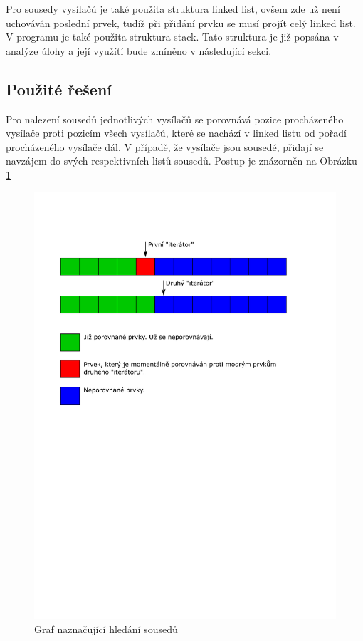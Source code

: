 \documentclass[12pt]{article}
\begin{document}
Pro sousedy vysílačů je také použita struktura linked list, ovšem zde už není 
uchováván poslední prvek, tudíž při přidání prvku se musí projít celý linked
list.\\

V programu je také použita struktura stack. Tato struktura je již popsána v 
analýze úlohy a její využítí bude zmíněno v následující sekci.
%
\subsection{Použité řešení}
%
Pro nalezení sousedů jednotlivých vysílačů se porovnává pozice procházeného
vysílače proti pozicím všech vysílačů, které se nachází v linked listu od 
pořadí procházeného vysílače dál. V případě, že vysílače jsou sousedé, přidají
se navzájem do svých respektivních listů sousedů. Postup je znázorněn na
Obrázku \ref{img:neighbors}\\ 
%
\begin{figure}[H]
        \centering
	\includegraphics[width=\textwidth, trim={0 15cm 0 0}]{img/neighbor_finding.pdf}
        \caption{Graf naznačující hledání sousedů}
        \label{img:neighbors}
\end{figure}
\end{document}
